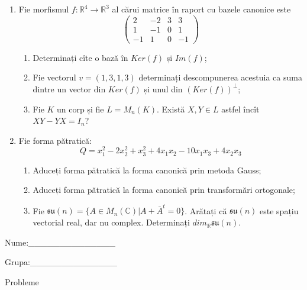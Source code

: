 \documentclass{article}
\begin{document}
\begin{enumerate}
 \item Fie morfismul $f:\mathbb{R}^4 \to \mathbb{R}^3$ al cărui matrice în raport cu bazele canonice este
$$\begin{pmatrix}
2&-2&3&3\\
1&-1&0&1\\
-1&1&0&-1
\end{pmatrix}$$

\begin{enumerate}
\item Determinați cîte o bază în $Ker(f)$ și $Im(f)$;
\item Fie vectorul $v=(1,3,1,3)$ determinați descompunerea acestuia ca suma dintre un vector din $Ker(f)$ și unul din $(Ker(f))^\perp$;
\item Fie $K$ un corp și fie $L=M_n(K)$. Există $X,Y \in L$ astfel încît $XY-YX=I_n$?  
\end{enumerate}
\item Fie forma pătratică:
$$Q= x_1^2-2x_2^2+x_3^2+4x_1x_2-10x_1x_3+4x_2x_3$$

\begin{enumerate}
\item Aduceți forma pătratică la forma canonică prin metoda Gauss;
\item Aduceți forma pătratică la forma canonică prin transformări ortogonale;
\item Fie $\mathfrak{su}(n)=\{ A \in M_n(\mathbb{C}) | A+\bar{A}^t=0\}$. Arătați că $\mathfrak{su}(n)$ este spațiu vectorial real, dar nu complex.
Determinați $dim_{\mathbb{R}}\mathfrak{su}(n)$.
\end{enumerate}
\end{enumerate}
\newpage
\begin{flushright}
Nume:\_\_\_\_\_\_\_\_\_\_\_\_\_\_
 
 
Grupa:\_\_\_\_\_\_\_\_\_\_\_\_\_\_
\end{flushright}
\begin{center}
\vspace{2cm}
{\Large Probleme}
\vspace{2cm}
\end{center}
\end{document}

